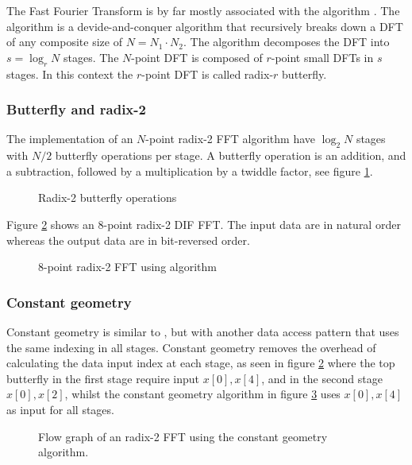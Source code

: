 The Fast Fourier Transform is by far mostly associated with the {\CTALG} algorithm \cite{cooley1965algorithm}. The {\CTALG} algorithm is a devide-and-conquer algorithm that recursively breaks down a \gls{DFT} of any composite size of $N = N_1{\cdot}N_2$. The algorithm decomposes the \gls{DFT} into $s = \log_r{N}$ stages. The $N$-point \gls{DFT} is composed of $r$-point small \gls{DFT}s in $s$ stages. In this context the $r$-point \gls{DFT} is called radix-$r$ butterfly.

\subsubsection{Butterfly and radix-2}

The implementation of an $N$-point radix-2 \gls{FFT} algorithm have $\log_2{N}$ stages with $N/2$ butterfly operations per stage. A butterfly operation is an addition, and a subtraction, followed by a multiplication by a twiddle factor, see figure \ref{fig:butterfly}.

\begin{figure}
	\centering
	
	\caption{Radix-2 butterfly operations}
	\label{fig:butterfly}
\end{figure}

Figure \ref{fig:cooley-tukey-8} shows an 8-point radix-2 \gls{DIF} \gls{FFT}. The input data are in natural order whereas the output data are in bit-reversed order.

\begin{figure}
	\centering
	
	\caption{8-point radix-2 FFT using {\CTALG} algorithm}
	\label{fig:cooley-tukey-8}
\end{figure}

\subsubsection{Constant geometry}

Constant geometry is similar to {\CTALG}, but with another data access pattern that uses the same indexing in all stages. Constant geometry removes the overhead of calculating the data input index at each stage, as seen in figure \ref{fig:cooley-tukey-8} where the top butterfly in the first stage require input $x[0], x[4]$, and in the second stage $x[0], x[2]$, whilst the constant geometry algorithm in figure \ref{fig:constant-geometry-8} uses $x[0], x[4]$ as input for all stages.

\begin{figure}
	\centering
	
	\caption{Flow graph of an radix-2 FFT using the constant geometry algorithm.}
	\label{fig:constant-geometry-8}
\end{figure}


